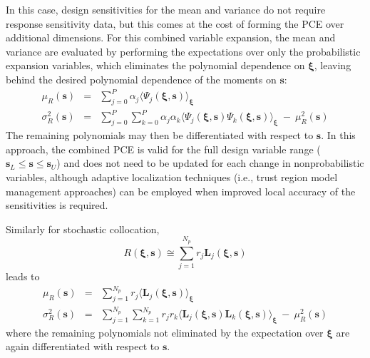 \noindent In this case, design sensitivities for the mean and variance
do not require response sensitivity data, but this comes at the cost
of forming the PCE over additional dimensions.  For this combined
variable expansion, the mean and variance are evaluated by performing
the expectations over only the probabilistic expansion variables,
which eliminates the polynomial dependence on $\boldsymbol{\xi}$,
leaving behind the desired polynomial dependence of the moments on
$\boldsymbol{s}$:
\begin{eqnarray}
\mu_R(\boldsymbol{s}) &=& \sum_{j=0}^P \alpha_j \langle \Psi_j(\boldsymbol{\xi},
\boldsymbol{s}) \rangle_{\boldsymbol{\xi}} \label{eq:muR_comb_pce} \\
\sigma^2_R(\boldsymbol{s}) &=& \sum_{j=0}^P \sum_{k=0}^P \alpha_j \alpha_k 
\langle \Psi_j(\boldsymbol{\xi}, \boldsymbol{s}) \Psi_k(\boldsymbol{\xi},
\boldsymbol{s}) \rangle_{\boldsymbol{\xi}} ~-~ \mu^2_R(\boldsymbol{s})
\label{eq:sigR_comb_pce}
\end{eqnarray}
The remaining polynomials may then be differentiated with respect to
$\boldsymbol{s}$. %
In this approach, the combined PCE is valid for the full design
variable range ($\boldsymbol{s}_L \le \boldsymbol{s} \le \boldsymbol{s}_U$)
and does not need to be updated for each change in nonprobabilistic variables,
although adaptive localization techniques (i.e., trust region model
management approaches) can be employed when improved local accuracy of
the sensitivities is required.

Similarly for stochastic collocation,
\begin{equation}
R(\boldsymbol{\xi}, \boldsymbol{s}) \cong \sum_{j=1}^{N_p} r_j 
\boldsymbol{L}_j(\boldsymbol{\xi}, \boldsymbol{s}) \label{eq:R_r_L_xi_s}
\end{equation}
leads to
\begin{eqnarray}
\mu_R(\boldsymbol{s}) &=& \sum_{j=1}^{N_p} r_j \langle 
\boldsymbol{L}_j(\boldsymbol{\xi}, \boldsymbol{s}) \rangle_{\boldsymbol{\xi}} 
\label{eq:muR_both_sc} \\
\sigma^2_R(\boldsymbol{s}) &=& \sum_{j=1}^{N_p} \sum_{k=1}^{N_p} r_j r_k 
\langle \boldsymbol{L}_j(\boldsymbol{\xi}, \boldsymbol{s}) 
\boldsymbol{L}_k(\boldsymbol{\xi}, \boldsymbol{s}) \rangle_{\boldsymbol{\xi}}
~-~ \mu^2_R(\boldsymbol{s}) \label{eq:sigR_both_sc}
\end{eqnarray}
where the remaining polynomials not eliminated by the expectation over
$\boldsymbol{\xi}$ are again differentiated with respect to $\boldsymbol{s}$.

